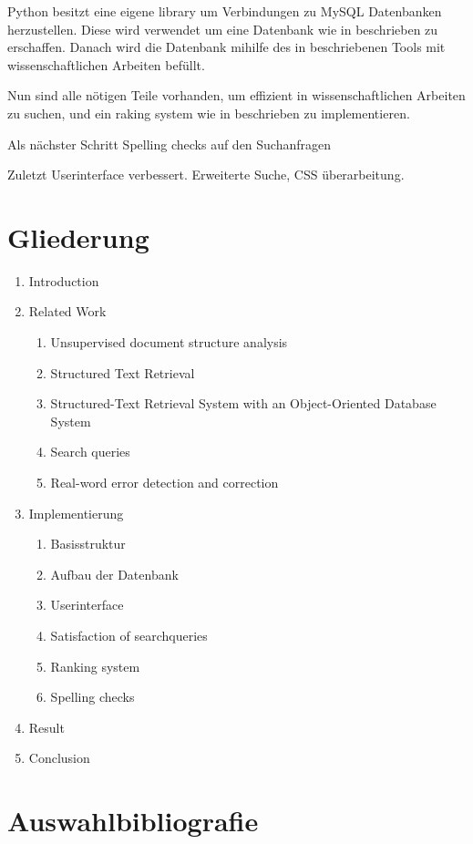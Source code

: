 \documentclass[a4paper, 12pt]{scrartcl}
\begin{document}
Python besitzt eine eigene library um Verbindungen zu MySQL Datenbanken herzustellen. Diese wird verwendet um eine Datenbank wie in \cite{YA94} beschrieben zu erschaffen. Danach wird die Datenbank mihilfe des 
in \cite{KGJK14} beschriebenen Tools mit wissenschaftlichen Arbeiten befüllt.

Nun sind alle nötigen Teile vorhanden, um effizient in wissenschaftlichen Arbeiten zu suchen, und ein raking system wie in \cite{MRS08, RNBY99} beschrieben zu implementieren.

Als nächster Schritt Spelling checks auf den Suchanfragen 

Zuletzt Userinterface verbessert. Erweiterte Suche, CSS überarbeitung.

\section{Gliederung}

\begin{enumerate}
 \item Introduction
 \item Related Work
 \begin{enumerate}
  \item Unsupervised document structure analysis
  \item Structured Text Retrieval
  \item Structured-Text Retrieval System with an Object-Oriented Database System
  \item Search queries
  \item Real-word error detection and correction
 \end{enumerate}
 \item Implementierung
 \begin{enumerate}
  \item Basisstruktur
  \item Aufbau der Datenbank
  \item Userinterface
  \item Satisfaction of searchqueries
  \item Ranking system
  \item Spelling checks
 \end{enumerate}
 \item Result
 \item Conclusion
\end{enumerate}

\section{Auswahlbibliografie}
\end{document}
